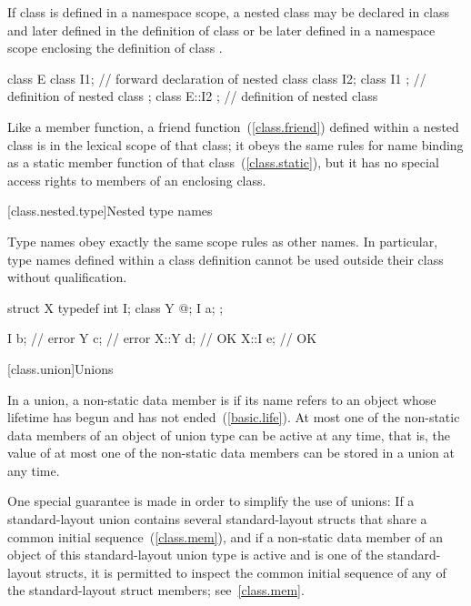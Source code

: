 \pnum
If class  is defined in a namespace scope, a nested class
 may be declared in class  and later defined in the
definition of class  or be later defined in a namespace scope
enclosing the definition of class .
%
\begin{example}

\begin{codeblock}
class E {
  class I1;                     // forward declaration of nested class
  class I2;
  class I1 { };                 // definition of nested class
};
class E::I2 { };                // definition of nested class
\end{codeblock}
\end{example}

\pnum
{}%
Like a member function, a friend function~(\ref{class.friend}) defined
within a nested class is in the lexical scope of that class; it obeys
the same rules for name binding as a static member function of that
class~(\ref{class.static}), but it has no special access rights to
members of an enclosing class.

[class.nested.type]{Nested type names}
%
%

\pnum
Type names obey exactly the same scope rules as other names. In
particular, type names defined within a class definition cannot be used
outside their class without qualification.
\begin{example}

%
\begin{codeblock}
struct X {
  typedef int I;
  class Y { @\commentellip@ };
  I a;
};

I b;                            // error
Y c;                            // error
X::Y d;                         // OK
X::I e;                         // OK
\end{codeblock}
\end{example}%

[class.union]{Unions}%

\pnum
In a union,
a non-static data member is 
if its name refers to an object
whose lifetime has begun and has not ended~(\ref{basic.life}).
At most one of the non-static data members of an object of union type
can be active at any
time, that is, the value of at most one of the non-static data members can be
stored in a union at any time. \begin{note} One special guarantee is made in order to
simplify the use of unions: If a standard-layout union contains several standard-layout
structs that share a common initial sequence~(\ref{class.mem}), and
if a non-static data member of an object of this standard-layout union type
is active and is one of the standard-layout structs,
it is permitted to inspect the common initial sequence
of any of the standard-layout struct members;
see~\ref{class.mem}.
\end{note}

